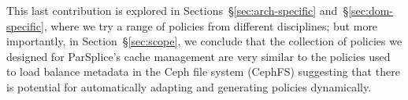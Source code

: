 
This last contribution is explored in Sections~\S\ref{sec:arch-specific}
and~\S\ref{sec:dom-specific}, where we try a range of policies from different
disciplines; but more importantly, in Section~\S\ref{sec:scope}, we conclude
that the collection of policies we designed for ParSplice's cache management
are very similar to the policies used to load balance metadata in the Ceph file
system (CephFS) suggesting that there is potential for automatically adapting
and generating policies dynamically. 


